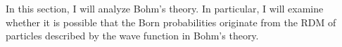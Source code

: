 In this section, I will analyze Bohm's theory. In particular, I will examine whether it is possible that the Born probabilities originate from the RDM of particles described by the wave function in Bohm's theory.


